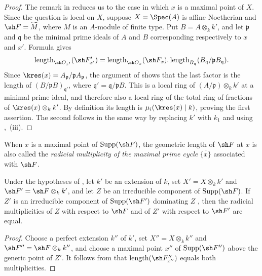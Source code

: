 \begin{proof}
The remark in  reduces us to the case in which $x$ is
a maximal point of $X$.
Since the question is local on $X$, suppose
$X=\Spec(A)$ is affine Noetherian and $\sh F=\widetilde M$, where
$M$ is an $A$-module of finite type.
Put $B=A\otimes_k k'$, and let $\mathfrak p$ and $\mathfrak q$ be the
minimal prime ideals of $A$ and $B$ corresponding respectively to
$x$ and $x'$.
Formula  gives
\[
\operatorname{length}_{\sh O_{x'}}(\sh F'_{x'})
=\operatorname{length}_{\sh O_x}(\sh F_x)
 .\operatorname{length}_{B_{\mathfrak q}}
 (B_{\mathfrak q}/\mathfrak pB_{\mathfrak q}).
\]
Since
$\kres(x)=A_{\mathfrak p}/\mathfrak pA_{\mathfrak p}$, the argument
of  shows that the last factor is the length of
$(B/\mathfrak pB)_{\mathfrak q'}$, where
$\mathfrak q'=\mathfrak q/\mathfrak pB$.
This is a local ring of
$(A/\mathfrak p)\otimes_k k'$ at a minimal prime ideal, and therefore
also a local ring of the total ring of fractions of
$\kres(x)\otimes_k k'$.
By definition its length is $\mu_i(\kres(x)\mid k)$, proving the
first assertion.
The second follows in the same way by replacing $k'$ with $k_1$ and
using ,~(iii).
\end{proof}

When $x$ is a maximal point of $\operatorname{Supp}(\sh F)$, the
geometric length of $\sh F$ at $x$ is also called the
\emph{radicial multiplicity of the maximal prime cycle}
$\overline{\{x\}}$ associated with $\sh F$.

\begin{corollary}[4.7.9]
\label{IV.4.7.9}
Under the hypotheses of , let $k'$ be an extension of
$k$, set $X'=X\otimes_k k'$ and $\sh F'=\sh F\otimes_k k'$, and let
$Z$ be an irreducible component of $\operatorname{Supp}(\sh F)$.
If $Z'$ is an irreducible component of
$\operatorname{Supp}(\sh F')$ dominating $Z$
, then the radicial multiplicities of $Z$ with respect
to $\sh F$ and of $Z'$ with respect to $\sh F'$ are equal.
\end{corollary}


\begin{proof}
Choose a perfect extension $k''$ of $k'$, set
$X''=X\otimes_k k''$ and $\sh F''=\sh F\otimes_k k''$, and choose a
maximal point $x''$ of $\operatorname{Supp}(\sh F'')$ above the
generic point of $Z'$.
It follows from  that
$\operatorname{length}(\sh F''_{x''})$ equals both multiplicities.
\end{proof}

